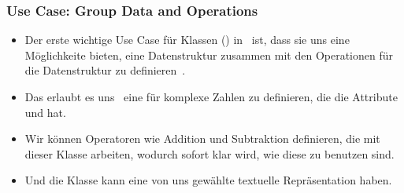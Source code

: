 \documentclass[aspectratio=169,mathserif,notheorems]{beamer}%
\begin{document}
\begin{frame}%
\frametitle{Use Case: Group Data and Operations}%
\begin{itemize}%
\item Der erste wichtige Use Case für Klassen () in \python\ ist, dass sie uns eine Möglichkeite bieten, eine Datenstruktur zusammen mit den Operationen für die Datenstruktur zu definieren~.%
%
\item<2-> Das erlaubt es uns \DEzB\ eine  für komplexe Zahlen zu definieren, die die Attribute  und  hat.%
%
\item<3-> Wir können Operatoren wie Addition und Subtraktion definieren, die mit dieser Klasse arbeiten, wodurch sofort klar wird, wie diese zu benutzen sind.%
%
\item<4-> Und die Klasse kann eine von uns gewählte textuelle Repräsentation haben.%
\end{itemize}%
\end{frame}%
%
\end{document}
